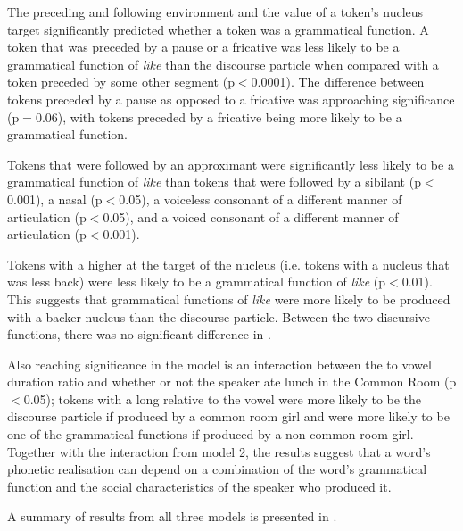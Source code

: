 \noindent The preceding and following environment and the  value of a token's nucleus target significantly predicted whether a token was a grammatical function. A token that was preceded by a pause or a fricative was less likely to be a grammatical function of \textit{like} than the discourse particle when compared with a token preceded by some other segment (p$<$0.0001). The difference between tokens preceded by a pause as opposed to a fricative was approaching significance (p$=$0.06), with tokens preceded by a fricative being more likely to be a grammatical function. 

Tokens that were followed by an approximant were significantly less likely to be a grammatical function of \textit{like} than tokens that were followed by a sibilant (p$<$0.001), a nasal (p$<$0.05), a voiceless consonant of a different manner of articulation (p$<$0.05), and a voiced consonant of a different manner of articulation (p$<$0.001). 

Tokens with a higher  at the target of the nucleus (i.e. tokens with a nucleus that was less back) were less likely to be a grammatical function of \textit{like} (p$<$0.01). This suggests that grammatical functions of \textit{like} were more likely to be produced with a backer  nucleus than the discourse particle. Between the two discursive functions, there was no significant difference in .

Also reaching significance in the model is an interaction between the  to vowel duration ratio and whether or not the speaker ate lunch in the Common Room (p$<$0.05); tokens with a long  relative to the vowel were more likely to be the discourse particle if produced by a common room girl and were more likely to be one of the grammatical functions if produced by a non-common room girl. Together with the interaction from model 2, the results suggest that a word's phonetic realisation can depend on a combination of the word's grammatical function and the social characteristics of the speaker who produced it.


A summary of results from all three models is presented in .

